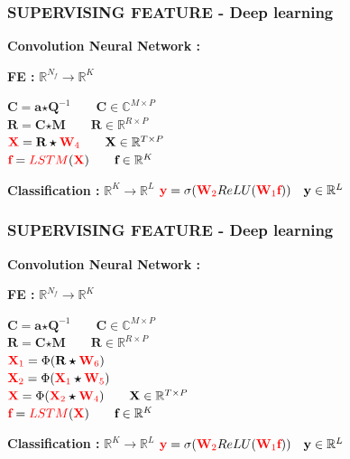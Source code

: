 \documentclass{beamer}
\begin{document}
\begin{frame}
\frametitle{SUPERVISING FEATURE - Deep learning}
\textbf{Convolution Neural Network :}
\begin{block}{\textbf{FE :} $\mathbb{R}^{N_{f}} \rightarrow \mathbb{R}^{K}$}

$\textbf{C} = \textbf{a} \bm{\star} \textbf{Q}^{-1} \qquad \textbf{C} \in \mathbb{C}^{M \times P}$\\
$\textbf{R} = \textbf{C} \bm{\star} \textbf{M} \qquad \textbf{R} \in \mathbb{R}^{R \times P}$\\
${\color{red}\textbf{X}} = \textbf{R} \bm{\star} {\color{red}\textbf{W}_{4}} \qquad \textbf{X} \in \mathbb{R}^{T \times P}$\\
${\color{red}\textbf{f}} = {\color{red}LSTM}({\color{red}\textbf{X}}) \qquad \textbf{f} \in \mathbb{R}^{K}$\\
\end{block}

\begin{block}{\textbf{Classification :} $\mathbb{R}^{K} \rightarrow \mathbb{R}^{L}$}
${\color{red}\textbf{y}} = \sigma({\color{red}\textbf{W}_{2}}ReLU({\color{red}\textbf{W}_{1}}{\color{red}\textbf{f}})) \quad \textbf{y} \in \mathbb{R}^{L}$
\end{block}
\end{frame}

\begin{frame}
\frametitle{SUPERVISING FEATURE - Deep learning}
\textbf{Convolution Neural Network :}
\begin{block}{\textbf{FE :} $\mathbb{R}^{N_{f}} \rightarrow \mathbb{R}^{K}$}

$\textbf{C} = \textbf{a} \bm{\star} \textbf{Q}^{-1} \qquad \textbf{C} \in \mathbb{C}^{M \times P}$\\
$\textbf{R} = \textbf{C} \bm{\star} \textbf{M} \qquad \textbf{R} \in \mathbb{R}^{R \times P}$\\
${\color{red}\textbf{X}_{1}} = \Phi (\textbf{R} \bm{\star} {\color{red}\textbf{W}_{6}})$\\
${\color{red}\textbf{X}_{2}} = \Phi ({\color{red}\textbf{X}_{1}} \bm{\star} {\color{red}\textbf{W}_{5}})$\\
${\color{red}\textbf{X}} = \Phi ({\color{red}\textbf{X}_{2}} \bm{\star} {\color{red}\textbf{W}_{4}}) \qquad \textbf{X} \in \mathbb{R}^{T \times P}$\\
${\color{red}\textbf{f}} = {\color{red}LSTM}({\color{red}\textbf{X}}) \qquad \textbf{f} \in \mathbb{R}^{K}$\\
\end{block}

\begin{block}{\textbf{Classification :} $\mathbb{R}^{K} \rightarrow \mathbb{R}^{L}$}
${\color{red}\textbf{y}} = \sigma({\color{red}\textbf{W}_{2}}ReLU({\color{red}\textbf{W}_{1}}{\color{red}\textbf{f}})) \quad \textbf{y} \in \mathbb{R}^{L}$
\end{block}
\end{frame}
\end{document}
